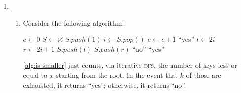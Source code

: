 \documentclass[10pt, letterpaper]{article}
\begin{document}

\begin{enumerate}[label={\bfseries Q\arabic*.}]
  \item
    \begin{enumerate}
      \item
        Consider the following algorithm:
        \vspace{-5mm}
        \begin{center}
          \begin{minipage}{\linewidth}
            \begin{algorithm}[H]
              \caption{$\textsc{Is-Smaller}(A,x,k)$}\label{alg:is-smaller}
              \begin{algorithmic}[1]
                \State $c \gets 0$ 
                \State $S \gets \varnothing$ 
                \State $S.push(1)$ 
                  \State $i \gets S.pop()$
                    \State $c \gets c + 1$
                      \State \Return ``yes''
                    \EndIf
                    \State $l \gets 2i$
                    \State $r \gets 2i + 1$
                      \State $S.push(l)$
                    \EndIf
                      \State $S.push(r)$
                    \EndIf
                  \EndIf
                \EndWhile
                  \State \Return ``no''
                \Else
                  \State \Return ``yes''
                \EndIf
              \end{algorithmic}
            \end{algorithm}
          \end{minipage}
        \end{center}

        \autoref{alg:is-smaller} just counts, via iterative \textsc{dfs}, the number of keys
        less or equal to $x$ starting from the root. In the event that $k$ of those are
        exhausted, it returns ``yes''; otherwise, it returns ``no''.


\end{enumerate}
\end{enumerate}
\end{document}

